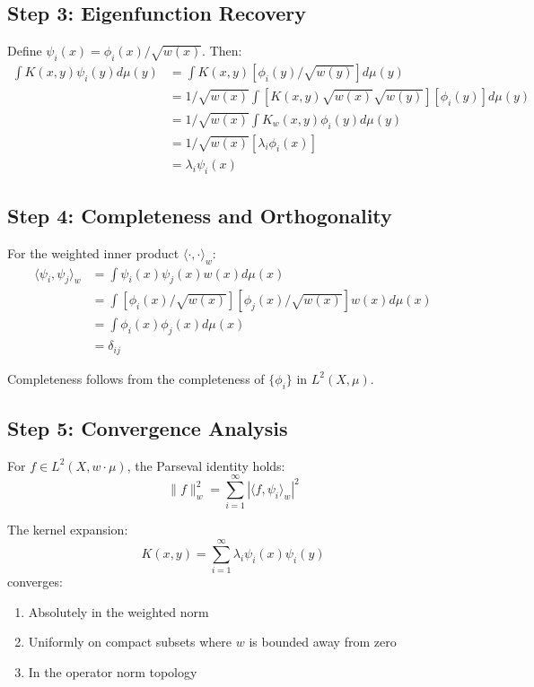 \documentclass{article}
\begin{document}
\subsection{Step 3: Eigenfunction Recovery}

Define $\psi_i(x) = \phi_i(x)/\sqrt{w(x)}$. Then:
\begin{align*}
\int K(x,y)\psi_i(y)d\mu(y) &= \int K(x,y)[\phi_i(y)/\sqrt{w(y)}]d\mu(y) \\
&= 1/\sqrt{w(x)} \int [K(x,y)\sqrt{w(x)}\sqrt{w(y)}][\phi_i(y)]d\mu(y) \\
&= 1/\sqrt{w(x)} \int K_w(x,y)\phi_i(y)d\mu(y) \\
&= 1/\sqrt{w(x)} [\lambda_i\phi_i(x)] \\
&= \lambda_i\psi_i(x)
\end{align*}

\subsection{Step 4: Completeness and Orthogonality}

For the weighted inner product $\langle\cdot,\cdot\rangle_w$:
\begin{align*}
\langle\psi_i,\psi_j\rangle_w &= \int \psi_i(x)\psi_j(x)w(x)d\mu(x) \\
&= \int [\phi_i(x)/\sqrt{w(x)}][\phi_j(x)/\sqrt{w(x)}]w(x)d\mu(x) \\
&= \int \phi_i(x)\phi_j(x)d\mu(x) \\
&= \delta_{ij}
\end{align*}

Completeness follows from the completeness of $\{\phi_i\}$ in $L^2(X,\mu)$.

\subsection{Step 5: Convergence Analysis}

For $f \in L^2(X,w\cdot\mu)$, the Parseval identity holds:
\[
\|f\|^2_w = \sum_{i=1}^{\infty} |\langle f,\psi_i\rangle_w|^2
\]

The kernel expansion:
\[
K(x,y) = \sum_{i=1}^{\infty} \lambda_i \psi_i(x)\psi_i(y)
\]
converges:
\begin{enumerate}
    \item Absolutely in the weighted norm
    \item Uniformly on compact subsets where $w$ is bounded away from zero
    \item In the operator norm topology
\end{enumerate}
\end{document}
